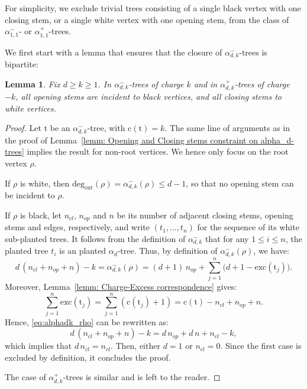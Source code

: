 \documentclass[11pt,reqno,tbtags]{amsart}
\newcommand{\rt}{\mathrm{t}}
\newcommand{\rc}{\mathrm{c}}
\newtheorem{lemm}[theo]{Lemma}
\numberwithin{equation}{section}
\numberwithin{theo}{section}
\theoremstyle{definition}
\newcommand{\out}{\mathrm{deg_{out}}}
\begin{document}
For simplicity, we exclude trivial trees consisting of a single black vertex with one closing stem, or a single white vertex with one opening stem, from the class of $\alpha_{1,1}^-$- or $\alpha_{1,1}^+$-trees.

\bigskip

We first start with a lemma that ensures that the closure of $\alpha_{d,k}^-$-trees is bipartite:

\begin{lemm}\label{lemm: Opening and Closing stems constraint on alpha_dk-trees}
Fix $d \geq k\geq 1$. In $\alpha_{d,k}^-$-trees of charge $k$ and in $\alpha_{d,k}^+$-trees of charge $-k$, all opening stems are incident to black vertices, and all closing stems to white vertices. 
\end{lemm}
\begin{proof}
Let $\rt$ be an $\alpha_{d,k}^-$-tree, with $\rc(\rt)=k$. The same line of arguments as in the proof of Lemma~\ref{lemm: Opening and Closing stems constraint on alpha_d-trees} implies the result for non-root vertices. We hence only focus on the root vertex $\rho$. 

If $\rho$ is white, then $\out(\rho) = \alpha_{d,k}^- (\rho) \leq d-1$, so that no opening stem can be incident to $\rho$. 

If $\rho$ is black, let $n_{cl}$, $n_{op}$ and $n$ be its number of adjacent closing stems, opening stems and edges, respectively, and write $(t_1,\ldots,t_n)$ for the sequence of its white sub-planted trees. It follows from the definition of $\alpha_{d,k}^-$ that for any $1\leq i\leq n$, the planted tree $t_i$ is an planted $\alpha_d$-tree. Thus, by definition of $\alpha_{d,k}^-(\rho)$, we have:
\begin{equation}\label{eq:alphadk_rho}
	d\,(n_{cl}+n_{op}+n)-k = \alpha_{d,k}^-(\rho) = (d+1)\,n_{op} + \sum_{j=1}^n{\big(d+1-\mathrm{exc}(\rt_j)\big)}.
\end{equation}
Moreover, Lemma~\ref{lemm: Charge-Excess correspondence} gives:
\[
\sum_{j=1}^n \mathrm{exc}(\rt_j)=\sum_{j=1}^n(\rc(\rt_j)+1)=\rc(\rt)-n_{cl}+n_{op}+n.
\]
Hence, \eqref{eq:alphadk_rho} can be rewritten as:
\begin{equation*}
	d\,(n_{cl}+n_{op}+n)-k = d\,n_{op} + d\,n  + n_{cl}  - k,
\end{equation*}
which implies that $d\,n_{cl} = n_{cl}$. Then, either $d=1$ or $n_{cl}=0$. Since the first case is excluded by definition, it concludes the proof. \

The case of $\alpha_{d,k}^+$-trees is similar and is left to the reader. 
\end{proof}
\end{document}
